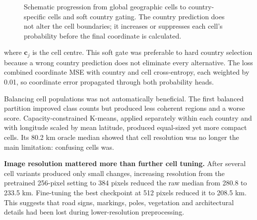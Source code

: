 \documentclass[10pt]{article}
\begin{document}
\begin{figure}[h]

\caption{
Schematic progression from global geographic cells to
country-specific cells and soft country gating. The country
prediction does not alter the cell boundaries; it increases
or suppresses each cell's probability before the final
coordinate is calculated.
}

\label{fig:cell_progression}
\end{figure}

where $\mathbf c_j$ is the cell centre. This soft gate was preferable to hard
country selection because a wrong country prediction does not eliminate every
alternative. The loss combined coordinate MSE with country and cell
cross-entropy, each weighted by 0.01, so coordinate error propagated through
both probability heads.

Balancing cell populations was not automatically beneficial. The first balanced
partition improved class counts but produced less coherent regions and a worse
score. Capacity-constrained K-means, applied separately within each country and
with longitude scaled by mean latitude, produced equal-sized yet more compact
cells. Its 80.2 km oracle median showed that cell resolution was no longer the
main limitation: confusing cells was.

\textbf{Image resolution mattered more than further cell tuning.}
After several cell variants produced only small changes, increasing resolution
from the pretrained 256-pixel setting to 384 pixels reduced the raw median from
280.8 to 233.5 km. Fine-tuning the best checkpoint at 512 pixels reduced it to
208.5 km. This suggests that road signs, markings, poles, vegetation and
architectural details had been lost during lower-resolution preprocessing.
\end{document}

